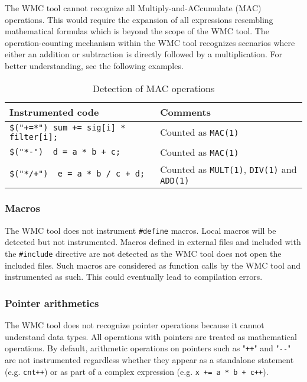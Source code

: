 The WMC tool cannot recognize all Multiply-and-ACcumulate (MAC) operations. This would require the expansion of all expressions resembling mathematical formulas which is beyond the scope of the WMC tool. The operation-counting mechanism within the WMC tool recognizes scenarios where either an addition or subtraction is directly followed by a multiplication. For better understanding, see the following examples.

\begin{table}[ht]
\centering
\caption{Detection of MAC operations}
\begin{tabular}{|p{}<{\raggedright}|p{}<{\raggedright}|}
\hline
\textbf{Instrumented code} & \textbf{Comments} \\
\hline
\verb|$("+=*") sum += sig[i] * filter[i];| & Counted as \verb|MAC(1)| \\
\hline
\verb|$("*-")  d = a * b + c;| & Counted as \verb|MAC(1)| \\
\hline
\verb|$("*/+")  e = a * b / c + d;| & Counted as \verb|MULT(1)|, \verb|DIV(1)| and \verb|ADD(1)| \\
\hline
\end{tabular}
\label{tab:detectiuon_of_mac}
\end{table}

\subsubsection{Macros}

The WMC tool does not instrument \verb|#define| macros. Local macros will be detected but not instrumented. Macros defined in external files and included with the \verb|#include| directive are not detected as the WMC tool does not open the included files. Such macros are considered as function calls by the WMC tool and instrumented as such. This could eventually lead to compilation errors.

\subsubsection{Pointer arithmetics}

The WMC tool does not recognize pointer operations because it cannot understand data types. All operations with pointers are treated as mathematical operations. By default, arithmetic operations on pointers such as "\verb|++|" and "\verb|--|" are not instrumented regardless whether they appear as a standalone statement (e.g. \verb|cnt++|) or as part of a complex expression (e.g. \verb|x += a * b + c++|).

